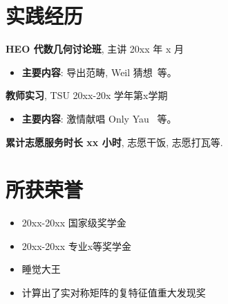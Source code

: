 \documentclass[11pt]{article}
\newlength{\iconwidth}
\begin{document}
    \begin{minipage}[t]{\textwidth}
    \section[实践经历]{\makebox[\iconwidth][c]{\color{primary_color}{\faChalkboardTeacher}}\quad 实践经历}
    
    \vspace{0.5em}
    {\large \textbf{HEO 代数几何讨论班}}, 主讲 \hfill 20xx 年 x 月
    \begin{itemize}
        \item \textbf{主要内容}: 导出范畴, Weil 猜想\ 等。
    \end{itemize}

    \vspace{0.5em}
    {\large \textbf{教师实习}}, TSU \hfill 20xx-20x 学年第x学期
    \begin{itemize}
        \item \textbf{主要内容}: 激情献唱 Only Yau \ 等。
    \end{itemize}

    \vspace{0.5em}
    {\large \textbf{累计志愿服务时长 xx 小时}}, 志愿干饭, 志愿打瓦等. 

    
    \vspace{1.2em}
    \end{minipage}

    \begin{minipage}[t]{\textwidth}
    \section[所获荣誉]{\makebox[\widthof{\faStar}][c]{\color{primary_color}{\faStar}}\quad 所获荣誉}
     \begin{multicols}{2}
         \begin{itemize}
             \item 20xx-20xx 国家级奖学金
             \item 20xx-20xx 专业x等奖学金
         \end{itemize}

         \begin{itemize}
            \item 睡觉大王
            \item 计算出了实对称矩阵的复特征值重大发现奖
         \end{itemize}
     \end{multicols}
     \vspace{1.2em}
    \end{minipage}
    
\end{document}
